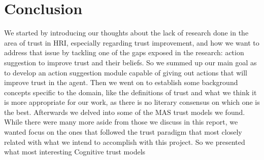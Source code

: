\section{Conclusion}
\label{sec:Conclusion}
We started by introducing our thoughts about the lack of research done in the area of trust in \ac{HRI}, especially regarding trust improvement, and how we want to address that issue by tackling one of the gaps exposed in the research: action suggestion to improve trust and their beliefs. So we summed up our main goal as to develop an action suggestion module capable of giving out actions that will improve trust in the agent. Then we went on to establish some background concepts specific to the domain, like the definitions of trust and what we think it is more appropriate for our work, as there is no literary consensus on which one is the best. Afterwards we delved into some of the \ac{MAS} trust models we found. While there were many more aside from those we discuss in this report, we wanted focus on the ones that followed the trust paradigm that most closely related with what we intend to accomplish with this project. So we presented what most interesting Cognitive trust models